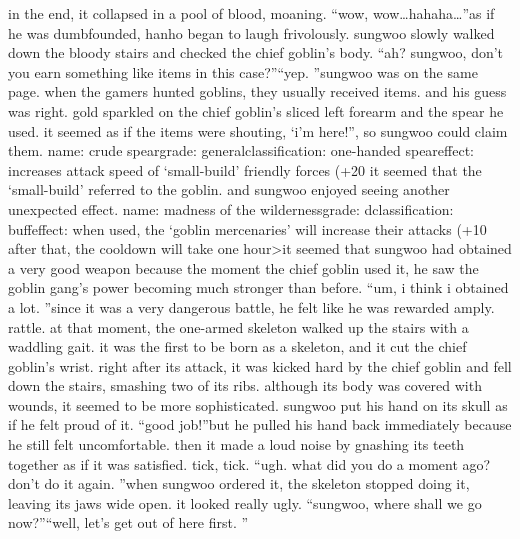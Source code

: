 in the end, it collapsed in a pool of blood, moaning.
“wow, wow…hahaha…”as if he was dumbfounded, hanho began to laugh frivolously.
 sungwoo slowly walked down the bloody stairs and checked the chief goblin’s body.
“ah? sungwoo, don’t you earn something like items in this case?”“yep.
”sungwoo was on the same page.
 when the gamers hunted goblins, they usually received items.
and his guess was right.
 gold sparkled on the chief goblin’s sliced left forearm and the spear he used.
 it seemed as if the items were shouting, ‘i’m here!”, so sungwoo could claim them.
name: crude speargrade: generalclassification: one-handed speareffect: increases attack speed of ‘small-build’ friendly forces (+20%
it seemed that the ‘small-build’ referred to the goblin.
 and sungwoo enjoyed seeing another unexpected effect.
name: madness of the wildernessgrade: dclassification: buffeffect: when used, the ‘goblin mercenaries’ will increase their attacks (+10%
 after that, the cooldown will take one hour>it seemed that sungwoo had obtained a very good weapon because the moment the chief goblin used it, he saw the goblin gang’s power becoming much stronger than before.
“um, i think i obtained a lot.
”since it was a very dangerous battle, he felt like he was rewarded amply.
rattle.
at that moment, the one-armed skeleton walked up the stairs with a waddling gait.
 it was the first to be born as a skeleton, and it cut the chief goblin’s wrist.
 right after its attack, it was kicked hard by the chief goblin and fell down the stairs, smashing two of its ribs.
 although its body was covered with wounds, it seemed to be more sophisticated.
sungwoo put his hand on its skull as if he felt proud of it.
“good job!”but he pulled his hand back immediately because he still felt uncomfortable.
 then it made a loud noise by gnashing its teeth together as if it was satisfied.
tick, tick.
“ugh.
 what did you do a moment ago? don’t do it again.
”when sungwoo ordered it, the skeleton stopped doing it, leaving its jaws wide open.
 it looked really ugly.
“sungwoo, where shall we go now?”“well, let’s get out of here first.
”

